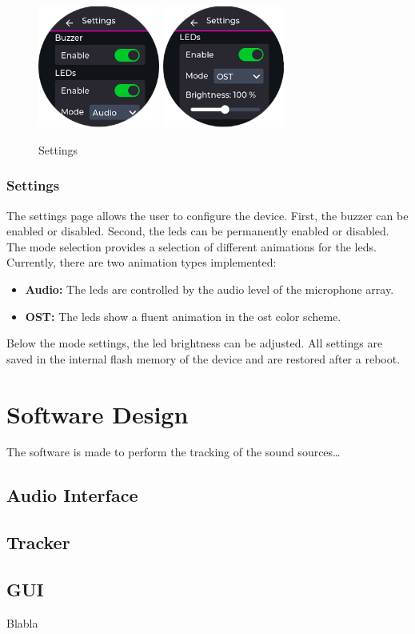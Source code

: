 \begin{minipage}{\linewidth}
	\begin{figure}
		\vspace{-0.6cm}
		\includegraphics[width=4cm, trim={0 -1.0cm 0 0}]{images/6_design_final/gui/13_settings.png}
		\includegraphics[width=4cm]{images/6_design_final/gui/14_settings.png}
		\centering
		\caption{Settings}
		\label{fig:final_design_gui_settings}
	\end{figure}
	\subsubsection{Settings}
	The settings page allows the user to configure the device.
	First, the buzzer can be enabled or disabled.
	Second, the \acrshort{led}s can be permanently enabled or disabled.
	The mode selection provides a selection of different animations for the \acrshort{led}s.
	Currently, there are two animation types implemented:
	\begin{itemize}
		\setlength{\itemindent}{5mm}
		\setlength{\leftmargin}{10mm}
		\item \textbf{Audio:} The \acrshort{led}s are controlled by the audio level of the microphone array.
		\item \textbf{OST:} The \acrshort{led}s show a fluent animation in the \acrshort{ost} color scheme.
	\end{itemize}
	Below the mode settings, the \acrshort{led} brightness can be adjusted.
	All settings are saved in the internal flash memory of the device and are restored after a reboot.
\end{minipage}


\newpage
\section{Software Design}
The software is made to perform the tracking of the sound sources\dots

\subsection{Audio Interface}

\subsection{Tracker}

\subsection{GUI}


Blabla
